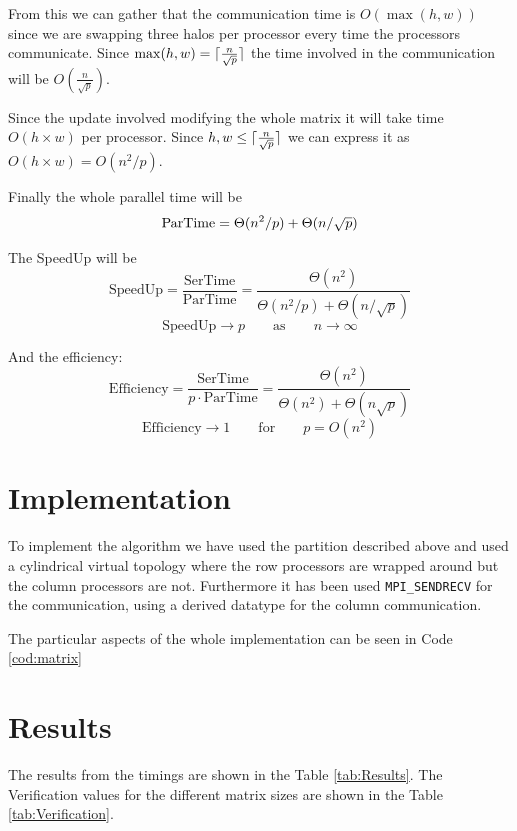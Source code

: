\documentclass[a4paper]{article}
\begin{document}
    From this we can gather that the communication time is $O(\max(h,w))$ since we are swapping three halos per processor every time the processors communicate. Since $\max(h,w) = \lceil\frac{n}{\sqrt{p}}\rceil$ the time involved in the communication will be $O(\frac{n}{\sqrt{p}})$.

    Since the update involved modifying the whole matrix it will take time $O(h\times w)$ per processor. Since $h,w \leq \lceil\frac{n}{\sqrt{p}}\rceil$ we can express it as $O(h\times w) = O(n^2/p)$.

    Finally the whole parallel time will be
    \begin{equation}
        \text{ParTime} = \Theta(n^2/p) + \Theta(n/\sqrt{p})\\
    \end{equation}

    The SpeedUp will be
    \begin{equation}
        \text{SpeedUp} = \frac{\text{SerTime}}{\text{ParTime}} = \frac{\Theta(n^2)}{\Theta(n^2/p) + \Theta(n/\sqrt{p})}
    \end{equation}
    \begin{equation}
        \text{SpeedUp} \rightarrow p \qquad\text{as}\qquad n \rightarrow \infty
        \label{eq:SpeedUp}
    \end{equation}

    And the efficiency:
    \begin{equation}
        \text{Efficiency}  = \frac{\text{SerTime}}{p \cdot \text{ParTime}} = \frac{\Theta(n^2)}{\Theta(n^2) + \Theta(n\sqrt{p})}
    \end{equation}
    \begin{equation}
        \text{Efficiency} \rightarrow 1 \qquad\text{for}\qquad p = O(n^2)
        \label{eq:Efficiency}
    \end{equation}
\newpage
\section{Implementation}
    To implement the algorithm we have used the partition described above and used a cylindrical virtual topology where the row processors are wrapped around but the column processors are not. Furthermore it has been used \texttt{MPI\_SENDRECV} for the communication, using a derived datatype for the column communication.

    The particular aspects of the whole implementation can be seen in Code \ref{cod:matrix}

\section{Results}
    The results from the timings are shown in the Table \ref{tab:Results}. The Verification values for the different matrix sizes are shown in the Table \ref{tab:Verification}.
\end{document}
